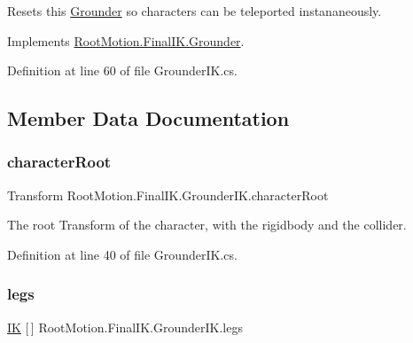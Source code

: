 Resets this \mbox{\hyperlink{class_root_motion_1_1_final_i_k_1_1_grounder}{Grounder}} so characters can be teleported instananeously. 



Implements \mbox{\hyperlink{class_root_motion_1_1_final_i_k_1_1_grounder_aecbd8b5addf2948f4d5fcd00a1b03314}{Root\+Motion.\+Final\+I\+K.\+Grounder}}.



Definition at line 60 of file Grounder\+I\+K.\+cs.



\subsection{Member Data Documentation}
\mbox{\label{class_root_motion_1_1_final_i_k_1_1_grounder_i_k_ae1fc0528fd20ffee592ef23b401e980d}} 
\subsubsection{\texorpdfstring{character\+Root}{characterRoot}}
{\footnotesize\ttfamily Transform Root\+Motion.\+Final\+I\+K.\+Grounder\+I\+K.\+character\+Root}



The root Transform of the character, with the rigidbody and the collider. 



Definition at line 40 of file Grounder\+I\+K.\+cs.

\mbox{\label{class_root_motion_1_1_final_i_k_1_1_grounder_i_k_a177f06c63c3b6a925ee8027e0734f7ad}} 
\subsubsection{\texorpdfstring{legs}{legs}}
{\footnotesize\ttfamily \mbox{\hyperlink{class_root_motion_1_1_final_i_k_1_1_i_k}{IK}} \mbox{[}$\,$\mbox{]} Root\+Motion.\+Final\+I\+K.\+Grounder\+I\+K.\+legs}



